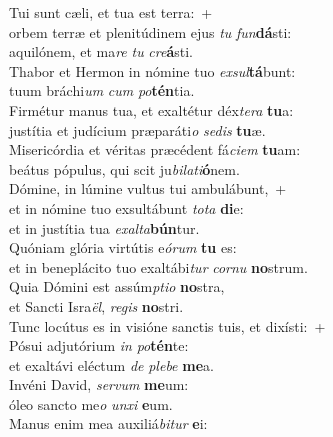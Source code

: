 \evenverse Tui sunt cæli, et tua est terra:~+\\
\evenverse  orbem terræ et plenitúdinem ejus \textit{tu} \textit{fun}\textbf{dá}sti:~\*\\
\evenverse aquilónem, et ma\textit{re} \textit{tu} \textit{cre}\textbf{á}sti.\\
\oddverse Thabor et Hermon in nómine tuo \textit{ex}\textit{sul}\textbf{tá}bunt:~\*\\
\oddverse tuum bráchi\textit{um} \textit{cum} \textit{po}\textbf{tén}tia.\\
\evenverse Firmétur manus tua, et exaltétur déx\textit{te}\textit{ra} \textbf{tu}a:~\*\\
\evenverse justítia et judícium præparáti\textit{o} \textit{se}\textit{dis} \textbf{tu}æ.\\
\oddverse Misericórdia et véritas præcédent fá\textit{ci}\textit{em} \textbf{tu}am:~\*\\
\oddverse beátus pópulus, qui scit ju\textit{bi}\textit{la}\textit{ti}\textbf{ó}nem.\\
\evenverse Dómine, in lúmine vultus tui ambulábunt,~+\\
\evenverse  et in nómine tuo exsultábunt \textit{to}\textit{ta} \textbf{di}e:~\*\\
\evenverse et in justítia tua \textit{e}\textit{xal}\textit{ta}\textbf{bún}tur.\\
\oddverse Quóniam glória virtútis e\textit{ó}\textit{rum} \textbf{tu} es:~\*\\
\oddverse et in beneplácito tuo exaltábi\textit{tur} \textit{cor}\textit{nu} \textbf{no}strum.\\
\evenverse Quia Dómini est assúm\textit{pti}\textit{o} \textbf{no}stra,~\*\\
\evenverse et Sancti Isra\textit{ël}, \textit{re}\textit{gis} \textbf{no}stri.\\
\oddverse Tunc locútus es in visióne sanctis tuis, et dixísti:~+\\
\oddverse  Pósui adjutórium \textit{in} \textit{po}\textbf{tén}te:~\*\\
\oddverse et exaltávi eléctum \textit{de} \textit{ple}\textit{be} \textbf{me}a.\\
\evenverse Invéni David, \textit{ser}\textit{vum} \textbf{me}um:~\*\\
\evenverse óleo sancto me\textit{o} \textit{un}\textit{xi} \textbf{e}um.\\
\oddverse Manus enim mea auxiliá\textit{bi}\textit{tur} \textbf{e}i:~\*\\
